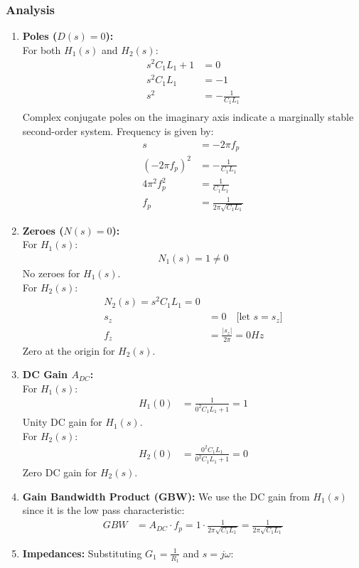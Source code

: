 \subsubsection{Analysis}
\begin{enumerate}
  \item \textbf{Poles (\(D(s) = 0\)):} \\
    For both \(H_1(s)\) and \(H_2(s)\):
    \begin{align*}
      s^2C_1L_1 + 1 &= 0 \\
      s^2C_1L_1 &= -1 \\
      s^2 &= -\frac{1}{C_1L_1} \\
    \end{align*}
    Complex conjugate poles on the imaginary axis indicate
    a marginally stable second-order system. Frequency is given
    by:
    \begin{align*}
      s &= -2 \pi f_p \\
      (-2 \pi f_p)^2 &= -\frac{1}{C_1L_1} \\
      4 \pi^2 f_p^2 &= \frac{1}{C_1L_1} \\
      f_p &= \frac{1}{2 \pi \sqrt{C_1L_1}}
    \end{align*}
  \item \textbf{Zeroes (\(N(s) = 0\)):} \\
    For \(H_1(s)\):
    \begin{align*}
        N_1(s) = 1 \neq 0
    \end{align*}
    No zeroes for \(H_1(s)\). \\
    For \(H_2(s)\):
    \begin{align*}
        N_2(s) = s^2C_1L_1 = 0 \\
        s_z &= 0 \quad \text{[let \(s = s_z\)]} \\
        f_z &= \frac{|s_z|}{2\pi} = 0 Hz
    \end{align*}
    Zero at the origin for \(H_2(s)\).
  \item \textbf{DC Gain \(A_{DC}\):} \\
    For \(H_1(s)\):
    \begin{align*}
      H_1(0) &= \frac{1}{0^2C_1L_1 + 1} = 1
    \end{align*}
    Unity DC gain for \(H_1(s)\). \\
    For \(H_2(s)\):
    \begin{align*}
      H_2(0) &= \frac{0^2C_1L_1}{0^2C_1L_1 + 1} = 0
    \end{align*}
    Zero DC gain for \(H_2(s)\).
  \item \textbf{Gain Bandwidth Product (GBW):}
    We use the DC gain from \(H_1(s)\) since it is the
    low pass characteristic:
    \begin{align*}
      GBW &= A_{DC} \cdot f_p = 1 \cdot \frac{1}{2 \pi \sqrt{C_1L_1}} = \frac{1}{2 \pi \sqrt{C_1L_1}}
    \end{align*}
  \item \textbf{Impedances:}
    Substituting \(G_1 = \frac{1}{R_1}\) and \(s = j \omega\):

\end{enumerate}

